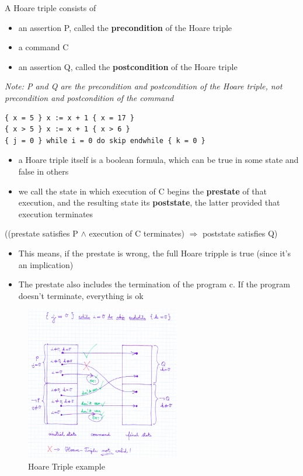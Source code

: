 A Hoare triple consists of

\begin{itemize}
\tightlist
\item
  an assertion P, called the \textbf{precondition} of the Hoare triple
\item
  a command C
\item
  an assertion Q, called the \textbf{postcondition} of the Hoare triple
\end{itemize}

\textit{Note: P and Q are the precondition and postcondition of the Hoare
triple, not precondition and postcondition of the command}

\begin{lstlisting}
{ x = 5 } x := x + 1 { x = 17 }
{ x > 5 } x := x + 1 { x > 6 }
{ j = 0 } while i = 0 do skip endwhile { k = 0 }
\end{lstlisting}

\begin{itemize}
\tightlist
\item
  a Hoare triple itself is a boolean formula, which can be true in some
  state and false in others
\item
  we call the state in which execution of C begins the \textbf{prestate}
  of that execution, and the resulting state its \textbf{poststate}, the
  latter provided that execution terminates
\end{itemize}

\begin{tcolorbox}[colback=red!5!white,colframe=red!75!black]
((prestate satisfies P $\wedge$ execution of C terminates) $\Rightarrow$ poststate satisfies Q)
\end{tcolorbox}

\begin{itemize}
\tightlist
\item
  This means, if the prestate is wrong, the full Hoare tripple is true
  (since it's an implication)
\item
  The prestate also includes the termination of the program c. If the
  program doesn't terminate, everything is ok
\end{itemize}

\begin{figure}[H]
\centering
\includegraphics[width=0.6\textwidth]{figures/hoaretriple.png}
\caption{Hoare Triple example}
\end{figure}

